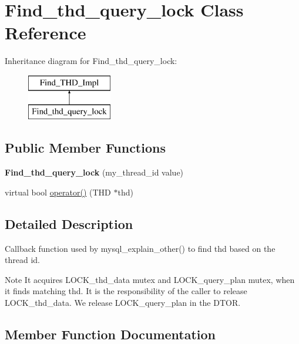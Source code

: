 \hypertarget{classFind__thd__query__lock}{}\section{Find\+\_\+thd\+\_\+query\+\_\+lock Class Reference}
\label{classFind__thd__query__lock}
Inheritance diagram for Find\+\_\+thd\+\_\+query\+\_\+lock\+:\begin{figure}[H]
\begin{center}
\leavevmode
\includegraphics[height=2.000000cm]{classFind__thd__query__lock}
\end{center}
\end{figure}
\subsection*{Public Member Functions}
\begin{DoxyCompactItemize}
\item 
\mbox{\label{classFind__thd__query__lock_a53c15f54d9d653f5dfe62e356949f5d9}} 
{\bfseries Find\+\_\+thd\+\_\+query\+\_\+lock} (my\+\_\+thread\+\_\+id value)
\item 
virtual bool \mbox{\hyperlink{classFind__thd__query__lock_a966a09cb01db67bb82ff6b8446cc0fe6}{operator()}} (T\+HD $\ast$thd)
\end{DoxyCompactItemize}


\subsection{Detailed Description}
Callback function used by mysql\+\_\+explain\+\_\+other() to find thd based on the thread id.

\begin{DoxyNote}{Note}
It acquires L\+O\+C\+K\+\_\+thd\+\_\+data mutex and L\+O\+C\+K\+\_\+query\+\_\+plan mutex, when it finds matching thd. It is the responsibility of the caller to release L\+O\+C\+K\+\_\+thd\+\_\+data. We release L\+O\+C\+K\+\_\+query\+\_\+plan in the D\+T\+OR. 
\end{DoxyNote}


\subsection{Member Function Documentation}
\mbox{\label{classFind__thd__query__lock_a966a09cb01db67bb82ff6b8446cc0fe6}} 

